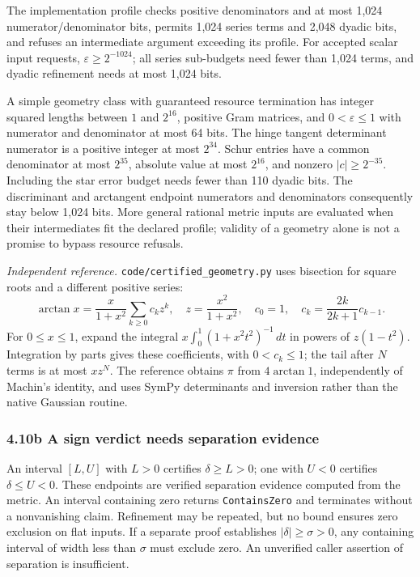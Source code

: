 \documentclass[
  english,
  10pt,
  a4paper,
]{article}
\begin{document}
The implementation profile checks positive denominators and at most
1,024 numerator/denominator bits, permits 1,024 series terms and 2,048
dyadic bits, and refuses an intermediate argument exceeding its profile.
For accepted scalar input requests, \(\varepsilon\ge2^{-1024}\); all
series sub-budgets need fewer than 1,024 terms, and dyadic refinement
needs at most 1,024 bits.

A simple geometry class with guaranteed resource termination has integer
squared lengths between \(1\) and \(2^{16}\), positive Gram matrices,
and \(0<\varepsilon\le1\) with numerator and denominator at most 64
bits. The hinge tangent determinant numerator is a positive integer at
most \(2^{34}\). Schur entries have a common denominator at most
\(2^{35}\), absolute value at most \(2^{16}\), and nonzero
\(|c|\ge2^{-35}\). Including the star error budget needs fewer than 110
dyadic bits. The discriminant and arctangent endpoint numerators and
denominators consequently stay below 1,024 bits. More general rational
metric inputs are evaluated when their intermediates fit the declared
profile; validity of a geometry alone is not a promise to bypass
resource refusals.

\emph{Independent reference.} \nolinkurl{code/certified_geometry.py}
uses bisection for square roots and a different positive series: \[
\arctan x=\frac{x}{1+x^2}\sum_{k\ge0}c_kz^k,\quad
z=\frac{x^2}{1+x^2},\quad c_0=1,\quad c_k=\frac{2k}{2k+1}c_{k-1}.
\] For \(0\le x\le1\), expand the integral
\(x\int_0^1(1+x^2t^2)^{-1}\,dt\) in powers of \(z(1-t^2)\). Integration
by parts gives these coefficients, with \(0<c_k\le1\); the tail after
\(N\) terms is at most \(xz^N\). The reference obtains \(\pi\) from
\(4\arctan1\), independently of Machin's identity, and uses SymPy
determinants and inversion rather than the native Gaussian routine.

\subsubsection{4.10b A sign verdict needs separation
evidence}\label{b-a-sign-verdict-needs-separation-evidence}

An interval \([L,U]\) with \(L>0\) certifies \(\delta\ge L>0\); one with
\(U<0\) certifies \(\delta\le U<0\). These endpoints are verified
separation evidence computed from the metric. An interval containing
zero returns \texttt{ContainsZero} and terminates without a nonvanishing
claim. Refinement may be repeated, but no bound ensures zero exclusion
on flat inputs. If a separate proof establishes \(|\delta|\ge\sigma>0\),
any containing interval of width less than \(\sigma\) must exclude zero.
An unverified caller assertion of separation is insufficient.
\end{document}
